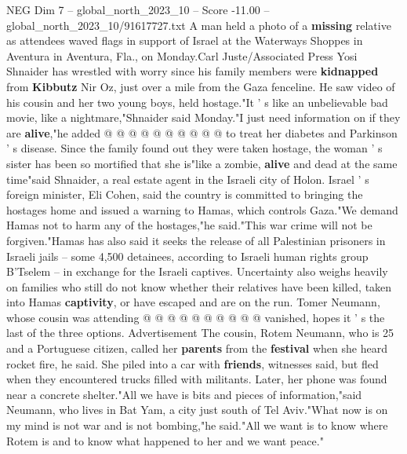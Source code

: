 \begin{textsample}{NEG Dim 7 – global\_north\_2023\_10 – Score -11.00 – global\_north\_2023\_10/91617727.txt}
A man held a photo of a \textbf{missing} relative as attendees waved flags in support of Israel at the Waterways Shoppes in Aventura in Aventura, Fla., on Monday.Carl Juste/Associated Press Yosi Shnaider has wrestled with worry since his family members were \textbf{kidnapped} from \textbf{Kibbutz} Nir Oz, just over a mile from the Gaza fenceline.
He saw video of his cousin and her two young boys, held hostage."It ' s like an unbelievable bad movie, like a nightmare,"Shnaider said Monday."I just need information on if they are \textbf{alive},"he added @ @ @ @ @ @ @ @ @ @ to treat her diabetes and Parkinson ' s disease.
Since the family found out they were taken hostage, the woman ' s sister has been so mortified that she is"like a zombie, \textbf{alive} and dead at the same time"said Shnaider, a real estate agent in the Israeli city of Holon.
Israel ' s foreign minister, Eli Cohen, said the country is committed to bringing the hostages home and issued a warning to Hamas, which controls Gaza."We demand Hamas not to harm any of the hostages,"he said."This war crime will not be forgiven."Hamas has also said it seeks the release of all Palestinian prisoners in Israeli jails -- some 4,500 detainees, according to Israeli human rights group B'Tselem -- in exchange for the Israeli captives.
Uncertainty also weighs heavily on families who still do not know whether their relatives have been killed, taken into Hamas \textbf{captivity}, or have escaped and are on the run.
Tomer Neumann, whose cousin was attending @ @ @ @ @ @ @ @ @ @ vanished, hopes it ' s the last of the three options.
Advertisement The cousin, Rotem Neumann, who is 25 and a Portuguese citizen, called her \textbf{parents} from the \textbf{festival} when she heard rocket fire, he said.
She piled into a car with \textbf{friends}, witnesses said, but fled when they encountered trucks filled with militants.
Later, her phone was found near a concrete shelter."All we have is bits and pieces of information,"said Neumann, who lives in Bat Yam, a city just south of Tel Aviv."What now is on my mind is not war and is not bombing,"he said."All we want is to know where Rotem is and to know what happened to her and we want peace."

\end{textsample}
